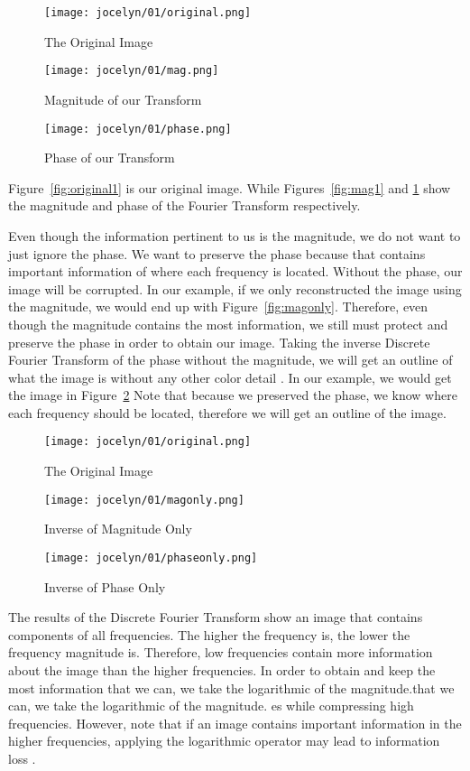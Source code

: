 \documentclass [../article.tex]{subfiles}
\begin{document}
  \begin{figure}[htbp]
    \texttt{[image: jocelyn/01/original.png]}
    \caption{The Original Image}
    \label{fig:original1}
  \endminipage\hfill
    \texttt{[image: jocelyn/01/mag.png]}
    \caption{Magnitude of our Transform}
    \label{fig:mag1}
  \endminipage\hfill
    \texttt{[image: jocelyn/01/phase.png]}
    \caption{Phase of our Transform}
    \label{fig:phase1}
  \endminipage
  \end{figure}
  Figure~\ref{fig:original1} is our original image. While
  Figures~\ref{fig:mag1} and \ref{fig:phase1} show the
  magnitude and phase of the Fourier Transform respectively.

  Even though the information pertinent to us is the magnitude,
  we do not want to just ignore the phase. We want to preserve
  the phase because that contains important information of where
  each frequency is located. Without the phase, our image will be
  corrupted.  In our example, if we only reconstructed the image
  using the magnitude, we would end up with Figure~\ref{fig:magonly}.
  Therefore, even though the magnitude contains the most
  information, we still must protect and preserve the phase
  in order to obtain our image. Taking the inverse Discrete Fourier
  Transform of the phase without the magnitude, we will get an
  outline of what the image is without any other color detail
  \cite{kundur}. In our example, we would get the image in
  Figure~\ref{fig:phaseonly} Note that because we
  preserved the phase, we know where each frequency should be
  located, therefore we will get an outline of the image.
  \begin{figure}[htbp]
    \texttt{[image: jocelyn/01/original.png]}
    \caption{The Original Image}
    \label{fig:original1_}
  \endminipage\hfill
    \texttt{[image: jocelyn/01/magonly.png]}
    \caption{Inverse of Magnitude Only}
    \label{fig:magonly}
  \endminipage\hfill
    \texttt{[image: jocelyn/01/phaseonly.png]}
    \caption{Inverse of Phase Only}
    \label{fig:phaseonly}
  \endminipage
  \end{figure}

  The results of the Discrete Fourier Transform show an image
  that contains components of all frequencies.  The higher the
  frequency is, the lower the frequency magnitude is.  Therefore,
  low frequencies contain more information about the image than
  the higher frequencies.  In order to obtain and keep the most
  information that we can, we take the logarithmic of the
  magnitude.that we can, we take the logarithmic of the magnitude.
  es while compressing high frequencies.  However, note that if
  an image contains important information in the higher
  frequencies, applying the logarithmic operator may lead
  to information loss \cite{fisher_perkins_walker_wolfart_2003}.
\end{document}
